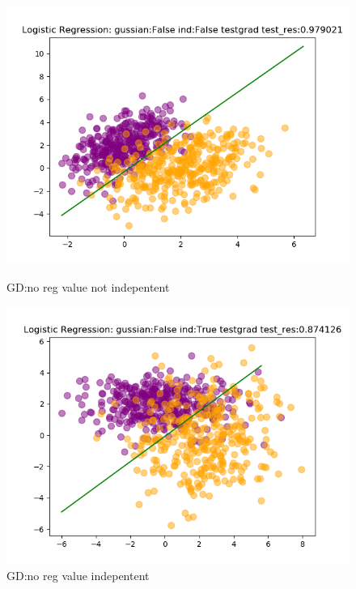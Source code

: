 \documentclass{article}
\begin{document}
\begin{figure}[h]
    \begin{minipage}[t]{0.4\linewidth}
    \centering
    \includegraphics[width=1.2\textwidth]{pic/LogisticRegression_gussian=Falseind=Falsetestgrad.png}
    \caption{GD:no reg value not indepentent}
    \label{fig:GD no reg value not indepentent}
    \end{minipage}
    \hfill
    \begin{minipage}[t]{0.4\linewidth}
    \centering
    \includegraphics[width=1.2\textwidth]{pic/LogisticRegression_gussian=Falseind=Truetestgrad.png}
    \caption{GD:no reg value indepentent}
    \label{fig:GD:no reg value indepentent}
    \end{minipage}

\end{figure}
\end{document}
